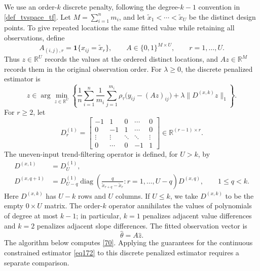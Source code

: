 \documentclass[twoside,11pt]{article}
\newenvironment{revision}{\color{revisionred}}{}
\begin{document}
\begin{revision}
We use an order-\(k\) discrete penalty, following the degree-\(k-1\)
convention in \eqref{def_tvspace_tf}. Let \(M=\sum_{i=1}^n m_i\), and
let \(\tilde x_1<\cdots<\tilde x_U\) be the distinct design points.
To give repeated locations the same fitted value while retaining all
observations, define
\[
A_{(i,j),r}=\mathbf{1}\{x_{ij}=\tilde x_r\},
\qquad A\in\{0,1\}^{M\times U},\qquad r=1,\ldots,U.
\]
Thus \(z\in\mathbb R^U\) records the values at the ordered distinct
locations, and \(Az\in\mathbb R^M\) records them in the original
observation order. For \(\lambda\geq0\), the discrete penalized estimator is
\begin{equation}
\label{70}
\hat z\in\arg\min_{z\in\mathbb R^U}
\left\{
\frac{1}{n}\sum_{i=1}^n\frac{1}{m_i}\sum_{j=1}^{m_i}
\rho_\tau\bigl(y_{ij}-(Az)_{ij}\bigr)
+\lambda\|D^{(x,k)}z\|_1
\right\}.
\end{equation}
For \(r\geq2\), let
\begin{equation}
\label{71}
D^{(1)}_r=
\begin{bmatrix}
-1&1&0&\cdots&0\\
0&-1&1&\cdots&0\\
\vdots&\vdots&\ddots&\ddots&\vdots\\
0&\cdots&0&-1&1
\end{bmatrix}
\in\mathbb R^{(r-1)\times r}.
\end{equation}
The uneven-input trend-filtering operator \cite{tibshirani2014adaptive}
is defined, for \(U>k\), by
\begin{equation}
\label{72}
\begin{aligned}
D^{(x,1)}&=D^{(1)}_U,\\
D^{(x,q+1)}
&=D^{(1)}_{U-q}
\operatorname{diag}\left(
\frac{q}{\tilde x_{r+q}-\tilde x_r}:r=1,\ldots,U-q
\right)D^{(x,q)},\qquad 1\leq q<k.
\end{aligned}
\end{equation}
Here \(D^{(x,k)}\) has \(U-k\) rows and \(U\) columns. If \(U\leq k\),
we take \(D^{(x,k)}\) to be the empty \(0\times U\) matrix.
The order-\(k\) operator annihilates the values of polynomials of degree
at most \(k-1\); in particular, \(k=1\) penalizes adjacent value
differences and \(k=2\) penalizes adjacent slope differences.
The fitted observation vector is
\begin{equation}
\label{73}
\hat\theta=A\hat z.
\end{equation}
The algorithm below computes \eqref{70}. Applying the guarantees for
the continuous constrained estimator \eqref{eq172} to this discrete
penalized estimator requires a separate comparison.


\end{revision}
\end{document}
